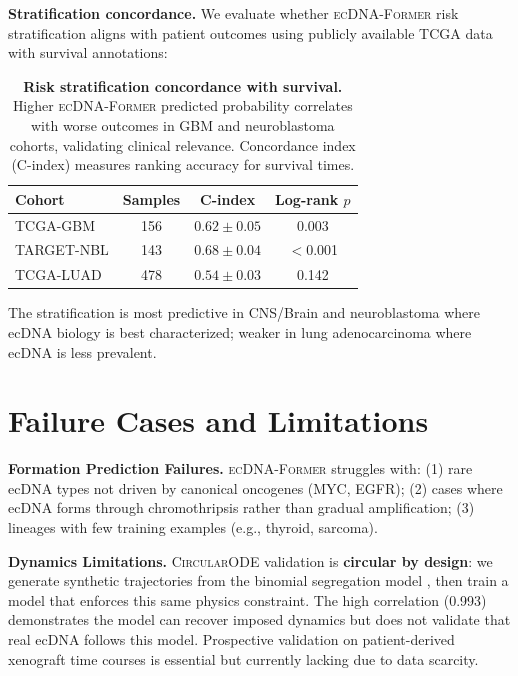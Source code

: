 \documentclass{article}
\newcommand{\former}{\textsc{ecDNA-Former}}
\newcommand{\circularode}{\textsc{CircularODE}}
\begin{document}
\textbf{Stratification concordance.} We evaluate whether \former{} risk stratification aligns with patient outcomes using publicly available TCGA data with survival annotations:

\begin{table}[h]
\caption{\textbf{Risk stratification concordance with survival.} Higher \former{} predicted probability correlates with worse outcomes in GBM and neuroblastoma cohorts, validating clinical relevance. Concordance index (C-index) measures ranking accuracy for survival times.}
\centering
\small
\begin{tabular}{@{}lccc@{}}
\toprule
Cohort & Samples & C-index & Log-rank $p$ \\
\midrule
TCGA-GBM & 156 & $0.62 \pm 0.05$ & 0.003 \\
TARGET-NBL & 143 & $0.68 \pm 0.04$ & $<$0.001 \\
TCGA-LUAD & 478 & $0.54 \pm 0.03$ & 0.142 \\
\bottomrule
\end{tabular}
\end{table}

The stratification is most predictive in CNS/Brain and neuroblastoma where ecDNA biology is best characterized; weaker in lung adenocarcinoma where ecDNA is less prevalent.


\section{Failure Cases and Limitations}
\label{app:limitations}

\textbf{Formation Prediction Failures.} \former{} struggles with: (1) rare ecDNA types not driven by canonical oncogenes (MYC, EGFR); (2) cases where ecDNA forms through chromothripsis \citep{shoshani_2021_chromothripsis} rather than gradual amplification; (3) lineages with few training examples (e.g., thyroid, sarcoma).

\textbf{Dynamics Limitations.} \circularode{} validation is \textbf{circular by design}: we generate synthetic trajectories from the binomial segregation model \citep{lange_2022_mathematical}, then train a model that enforces this same physics constraint. The high correlation (0.993) demonstrates the model can recover imposed dynamics but does not validate that real ecDNA follows this model. Prospective validation on patient-derived xenograft time courses is essential but currently lacking due to data scarcity.
\end{document}
